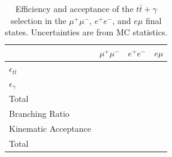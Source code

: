 




\begin{table}
\begin{center}
\begin{tabular}{l|ccc}
\hline
	 & \textbf{$\mu^+\mu^-$} & \textbf{$e^+e^-$} & \textbf{$e\mu$}  \\
\hline
	$\epsilon_{t\bar{t}}$ & & &  \\
	$\epsilon_{\gamma}$ & & &  \\
	Total &  & &  \\
\hline
	Branching Ratio & & &  \\
	Kinematic Acceptance & & & \\
	Total &  &  & \\
\hline	
\end{tabular}
\end{center}
\caption{Efficiency and acceptance of the $t\bar{t}+\gamma$ selection in the $\mu^+\mu^-$, $e^+e^-$, and $e\mu$ final states. Uncertainties are from MC statistics.}
\label{tab-efficiencyAndAcceptance}
\end{table}	